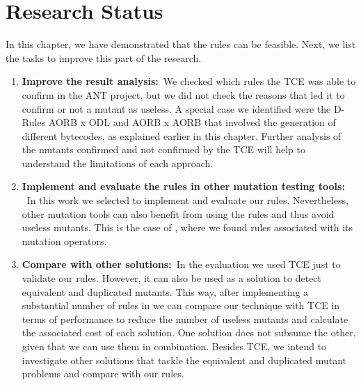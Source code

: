 \section{Research Status}
In this chapter, we have demonstrated that the rules can be feasible.
Next, we list the tasks to improve this part of the research.

\begin{enumerate}
    \item \textbf{Improve the result analysis:}~We checked which rules the TCE was able to confirm in the ANT project, but we did not check the reasons that led it to confirm or not a mutant as useless. A special case we identified were the D-Rules AORB x ODL and AORB x AORB that involved the generation of different bytecodes, as explained earlier in this chapter. Further analysis of the mutants confirmed and not confirmed by the TCE will help to understand the limitations of each approach.
    \item \textbf{Implement and evaluate the rules in other mutation testing tools: }~In this work we selected \mujava{} to implement and evaluate our rules. Nevertheless, other mutation tools can also benefit from using the rules and thus avoid useless mutants. This is the case of \pit{}, where we found rules associated with its mutation operators.
    \item \textbf{Compare with other solutions:}~In the evaluation we used TCE just to validate our rules. However, it can also be used as a solution to detect equivalent and duplicated mutants. This way, after implementing a substantial number of rules in \mujava{} we can compare our technique with TCE in terms of performance to reduce the number of useless mutants and calculate the associated cost of each solution. One solution does not subsume the other, given that we can use them in combination. Besides TCE, we intend to investigate other solutions that tackle the equivalent and duplicated mutant problems and compare with our rules.
\end{enumerate}
